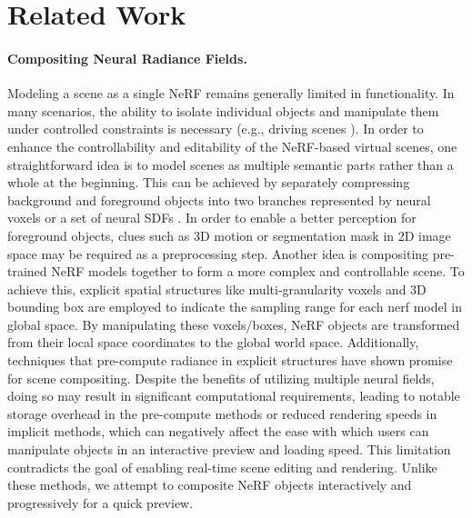 \documentclass[letterpaper]{article}
\begin{document}
\section{Related Work}
\paragraph{Compositing Neural Radiance Fields.}
Modeling a scene as a single NeRF remains generally limited in functionality. In many scenarios, the ability to isolate individual objects and manipulate them under controlled constraints is necessary (e.g., driving scenes \cite{krishnan2023lane}). In order to enhance the controllability and editability of the NeRF-based virtual scenes, one straightforward idea is to model scenes as multiple semantic parts rather than a whole at the beginning. This can be achieved by separately compressing background and foreground objects into two branches represented by neural voxels \cite{yang2021learning} or a set of neural SDFs \cite{wu2022object}. In order to enable a better perception for foreground objects, clues such as 3D motion \cite{shuai2022multinb} or segmentation mask \cite{kundu2022panoptic, tancik2022block} in 2D image space may be required as a preprocessing step. Another idea is compositing pre-trained NeRF models together to form a more complex and controllable scene. To achieve this, explicit spatial structures like multi-granularity voxels \cite{liu2020neural} and 3D bounding box \cite{ost2021neural, shuai2022multinb} are employed to indicate the sampling range for each nerf model in global space. By manipulating these voxels/boxes, NeRF objects are transformed from their local space coordinates to the global world space. Additionally, techniques that pre-compute radiance in explicit structures have shown promise for scene compositing. Despite the benefits of utilizing multiple neural fields, doing so may result in significant computational requirements, leading to notable storage overhead in the pre-compute methods or reduced rendering speeds in implicit methods, which can negatively affect the ease with which users can manipulate objects in an interactive preview and loading speed. This limitation contradicts the goal of enabling real-time scene editing and rendering. Unlike these methods, we attempt to composite NeRF objects interactively and progressively for a quick preview.
\end{document}
